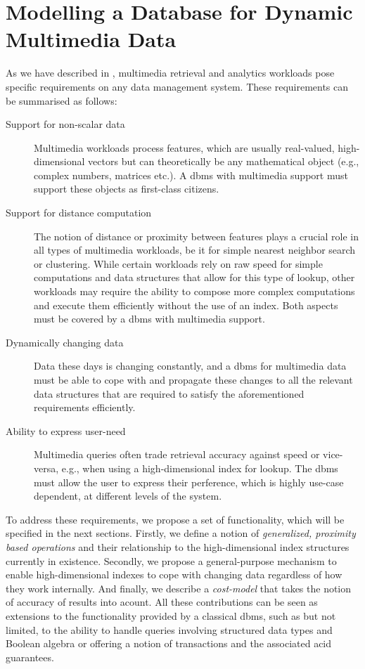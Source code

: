 \chapter{Modelling a Database for Dynamic Multimedia Data}
\label{chapter:system_model}

As we have described in , multimedia retrieval and analytics workloads pose specific requirements on any data management system. These requirements can be summarised as follows:

\begin{description}
    \item[Support for non-scalar data] Multimedia workloads process features, which are usually real-valued, high-dimensional vectors but can theoretically be any mathematical object (e.g., complex numbers, matrices etc.). A \acrshort{dbms} with multimedia support must support these objects as first-class citizens.
    \item[Support for distance computation] The notion of distance or proximity between features plays a crucial role in all types of multimedia workloads, be it for simple nearest neighbor search or clustering. While certain workloads rely on raw speed for simple computations and data structures that allow for this type of lookup, other workloads may require the ability to compose more complex computations and execute them efficiently without the use of an index. Both aspects must be covered by a \acrshort{dbms} with multimedia support.
    \item[Dynamically changing data] Data these days is changing constantly, and a \acrshort{dbms} for multimedia data must be able to cope with and propagate these changes to all the relevant data structures that are required to satisfy the aforementioned requirements efficiently.
    \item[Ability to express user-need] Multimedia queries often trade retrieval accuracy against speed or vice-versa, e.g., when using a high-dimensional index for lookup. The \acrshort{dbms} must allow the user to express their perference, which is highly use-case dependent, at different levels of the system.
\end{description}

To address these requirements, we propose a set of functionality, which will be specified in the next sections. Firstly, we define a notion of \emph{generalized, proximity based operations} and their relationship to the high-dimensional index structures currently in existence. Secondly, we propose a general-purpose mechanism to enable high-dimensional indexes to cope with changing data regardless of how they work internally. And finally, we describe a \emph{cost-model} that takes the notion of accuracy of results into acount. All these contributions can be seen as extensions to the functionality provided by a classical \acrshort{dbms}, such as but not limited, to the ability to handle queries involving structured data types and Boolean algebra or offering a notion of transactions and the associated \acrshort{acid} guarantees.

